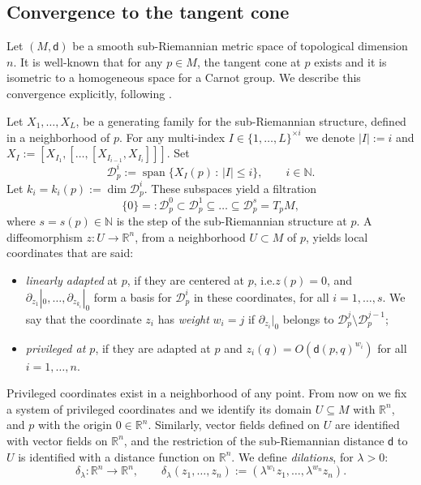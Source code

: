 \documentclass[11pt,a4paper]{article}
\theoremstyle{plain}
\theoremstyle{definition}
\theoremstyle{remark}
\numberwithin{equation}{section}
\newcommand{\R}{\mathbb{R}} %
\newcommand{\N}{\mathbb{N}} %
\newcommand{\distr}{\mathscr{D}}
\DeclareMathOperator{\spn}{\mathrm{span}}
\newcommand{\sfd}{\mathsf d}
\begin{document}
\subsection{Convergence to the tangent cone}\label{sec:ex:tangent}

Let $(M,\sfd)$ be a smooth sub-Riemannian metric space of topological dimension $n$. 
It is well-known that for any $p\in M$, the tangent cone at $p$ exists and it is isometric to a homogeneous space for a Carnot group. We describe this convergence explicitly, following \cite{Bellaiche}.

Let $X_1,\dots,X_L$, be a generating family for the sub-Riemannian structure, defined in a neighborhood of $p$. For any multi-index $I\in \{1,\dots,L\}^{\times i}$ we denote $|I| := i$ and $X_I := [X_{I_1},[\dots,[X_{I_{i-1}},X_{I_i}]]]$. Set
\begin{equation}
\distr_p^i := \spn\{X_I(p)\, :\, |I|\leq i\}, \qquad i\in \N.
\end{equation}
Let $k_i = k_i(p):=\dim \distr_p^i$. These subspaces yield a filtration
\begin{equation}\label{eq:filtration}
\{0\}=:\distr_p^0 \subset\distr_p^1\subseteq \dots \subseteq \distr_p^{s} =T_p M,
\end{equation}
where $s=s(p) \in \N$ is the step of the sub-Riemannian structure at $p$. A diffeomorphism $z:U\to \R^n$, from a neighborhood $U\subset M$ of $p$, yields local coordinates that are said:
\begin{itemize}
\item  \emph{linearly adapted} at $p$, if they are centered at $p$, i.e.\@ $z(p) =0$, and $\partial_{z_1}|_0,\dots,\partial_{z_{k_i}}|_0$ form a basis for $\distr_p^i$ in these coordinates, for all $i=1,\dots,s$. We say that the coordinate $z_i$ has \emph{weight} $w_i=j$ if $\partial_{z_i}|_0$ belongs to $\distr_p^j\setminus \distr_p^{j-1}$;
\item \emph{privileged at $p$}, if they are adapted at $p$ and $z_i(q) = O(\sfd(p,q)^{w_i})$ for all $i=1,\dots,n$.
\end{itemize}
Privileged coordinates exist in a neighborhood of any point. From now on we fix a system of privileged coordinates and we identify its domain $U\subseteq M$ with $\R^n$, and $p$ with the origin $0\in \R^n$. Similarly, vector fields defined on $U$ are identified with vector fields on $\R^n$, and the restriction of the sub-Riemannian distance $\sfd$ to $U$ is identified with a distance function on $\R^n$. We define \emph{dilations}, for $\lambda>0$:
\begin{equation}
\delta_\lambda : \R^n\to \R^n, \qquad \delta_\lambda(z_1,\dots,z_n) := (\lambda^{w_1}z_1,\dots,\lambda^{w_n}z_n).
\end{equation}
\end{document}
